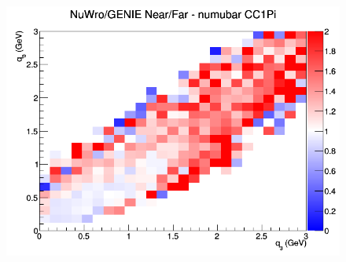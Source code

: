\documentclass[12pt]{article}
\begin{document}
\begin{figure}[h]
\endminipage
{}
\includegraphics[width=\linewidth]{eff_q0_q3/LAr/ratios/CC1Pi_NuWro_GENIE_numubar_NF_q3_q0.png}
\endminipage
\newline
\end{figure}
\clearpage
\end{document}
